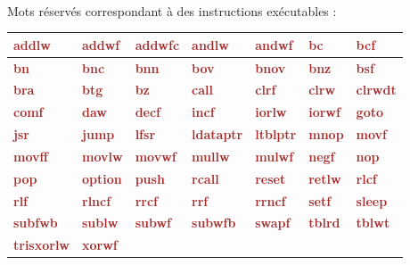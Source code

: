 ~\\
Mots réservés correspondant à des instructions exécutables :\\

\newcommand\keyWordInstruction[1]{\textcolor{brown}{\bf#1}}

\begin{tabular}{|l|l|l|l|l|l|l|}
  \hline
    \keyWordInstruction{addlw} & \keyWordInstruction{addwf} & \keyWordInstruction{addwfc} & \keyWordInstruction{andlw} & \keyWordInstruction{andwf} & \keyWordInstruction{bc} & \keyWordInstruction{bcf} \\
  \hline
    \keyWordInstruction{bn} & \keyWordInstruction{bnc} & \keyWordInstruction{bnn} & \keyWordInstruction{bov} & \keyWordInstruction{bnov} & \keyWordInstruction{bnz} & \keyWordInstruction{bsf} \\
  \hline
    \keyWordInstruction{bra} & \keyWordInstruction{btg} & \keyWordInstruction{bz} & \keyWordInstruction{call} & \keyWordInstruction{clrf} & \keyWordInstruction{clrw} & \keyWordInstruction{clrwdt} \\
  \hline
    \keyWordInstruction{comf} & \keyWordInstruction{daw} & \keyWordInstruction{decf} & \keyWordInstruction{incf} & \keyWordInstruction{iorlw} & \keyWordInstruction{iorwf} & \keyWordInstruction{goto} \\
  \hline
    \keyWordInstruction{jsr} & \keyWordInstruction{jump} & \keyWordInstruction{lfsr} & \keyWordInstruction{ldataptr} & \keyWordInstruction{ltblptr} & \keyWordInstruction{mnop} & \keyWordInstruction{movf} \\
  \hline
    \keyWordInstruction{movff} & \keyWordInstruction{movlw} & \keyWordInstruction{movwf} & \keyWordInstruction{mullw} & \keyWordInstruction{mulwf} & \keyWordInstruction{negf} & \keyWordInstruction{nop} \\
  \hline
    \keyWordInstruction{pop} & \keyWordInstruction{option} & \keyWordInstruction{push} & \keyWordInstruction{rcall} & \keyWordInstruction{reset} & \keyWordInstruction{retlw} & \keyWordInstruction{rlcf} \\
  \hline
    \keyWordInstruction{rlf} & \keyWordInstruction{rlncf} & \keyWordInstruction{rrcf} & \keyWordInstruction{rrf} & \keyWordInstruction{rrncf} & \keyWordInstruction{setf} & \keyWordInstruction{sleep} \\
  \hline
    \keyWordInstruction{subfwb} & \keyWordInstruction{sublw} & \keyWordInstruction{subwf} & \keyWordInstruction{subwfb} & \keyWordInstruction{swapf} & \keyWordInstruction{tblrd} & \keyWordInstruction{tblwt}\\
  \hline
    \keyWordInstruction{tris}\keyWordInstruction{xorlw} & \keyWordInstruction{xorwf} & & & & & \\
  \hline
\end{tabular}

